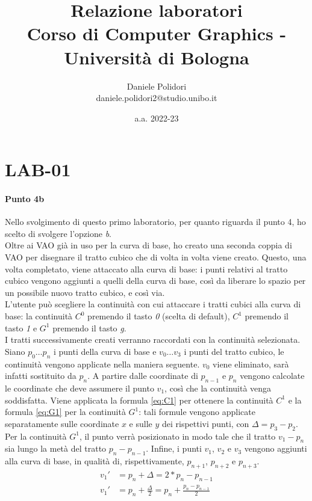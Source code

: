 \documentclass[a4paper, 12pt]{article}
\title{\textbf{Relazione laboratori}\\
        \normalsize Corso di Computer Graphics - Università di Bologna}
\author{Daniele Polidori\\ daniele.polidori2@studio.unibo.it}
\date{a.a. 2022-23}
\begin{document}
\maketitle


\section{LAB-01}

\paragraph{Punto 4b}
Nello svolgimento di questo primo laboratorio, per quanto riguarda il punto 4, ho scelto di svolgere l'opzione \textit{b}.\\
Oltre ai VAO già in uso per la curva di base, ho creato una seconda coppia di VAO per disegnare il tratto cubico che di volta in volta viene creato. Questo, una volta completato, viene attaccato alla curva di base: i punti relativi al tratto cubico vengono aggiunti a quelli della curva di base, così da liberare lo spazio per un possibile nuovo tratto cubico, e così via.\\
L'utente può scegliere la continuità con cui attaccare i tratti cubici alla curva di base: la continuità $C^0$ premendo il tasto \textit{0} (scelta di default), $C^1$ premendo il tasto \textit{1} e $G^1$ premendo il tasto \textit{g}.\\
I tratti successivamente creati verranno raccordati con la continuità selezionata. Siano $p_0 \dots p_n$ i punti della curva di base e $v_0 \dots v_3$ i punti del tratto cubico, le continuità vengono applicate nella maniera seguente. $v_0$ viene eliminato, sarà infatti sostituito da $p_n$. A partire dalle coordinate di $p_{n-1}$ e $p_n$ vengono calcolate le coordinate che deve assumere il punto $v_1$, così che la continuità venga soddisfatta. Viene applicata la formula \eqref{eq:C1} per ottenere la continuità $C^1$ e la formula \eqref{eq:G1} per la continuità $G^1$: tali formule vengono applicate separatamente sulle coordinate $x$ e sulle $y$ dei rispettivi punti, con $\Delta = p_3 - p_2$. Per la continuità $G^1$, il punto verrà posizionato in modo tale che il tratto $v_1 - p_n$ sia lungo la metà del tratto $p_n - p_{n-1}$. Infine, i punti $v_1$, $v_2$ e $v_3$ vengono aggiunti alla curva di base, in qualità di, rispettivamente, $p_{n+1}$, $p_{n+2}$ e $p_{n+3}$.
\begin{align}
  v_1' &= p_n + \Delta = 2*p_n - p_{n-1}             \label{eq:C1} \\
  v_1' &= p_n + \frac{\Delta}{2} = p_n + \frac{p_n - p_{n-1}}{2}   \label{eq:G1}
\end{align}
\end{document}
